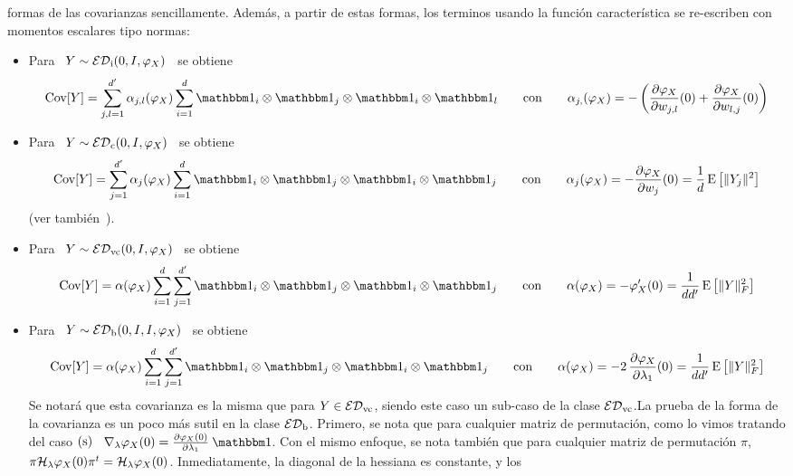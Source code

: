 \begin{itemize}
\begin{itemize}
    formas de las covarianzas sencillamente. Adem\'as, a partir de estas formas,
    los  terminos  usando  la  funci\'on  caracter\'istica  se  re-escriben  con
    momentos escalares tipo normas:
  \begin{itemize}
  \item Para \ $Y \sim \mathcal{ED}_{\mathrm{i}}(0,I,\varphi_X)$ \ se obtiene
  \[
  \Cov[Y] =  \sum_{j,l=1}^{d'} \alpha_{j,l}(\varphi_X) \sum_{i=1}^d  \un_i \otimes \un_j
  \otimes \un_i  \otimes \un_l \qquad \mbox{con} \qquad  \alpha_{j,}(\varphi_X) = -
   \left( \frac{\partial  \varphi_X}{\partial w_{j,l}}(0) + \frac{\partial
      \varphi_X}{\partial w_{l,j}}(0)
  \right) %
  \]
  \item Para \ $Y \sim \mathcal{ED}_{\mathrm{c}}(0,I,\varphi_X)$ \ se obtiene
  \[
  \Cov[Y] =  \sum_{j=1}^{d'} \alpha_j(\varphi_X) \sum_{i=1}^d  \un_i \otimes \un_j
  \otimes \un_i  \otimes \un_j \qquad \mbox{con} \qquad  \alpha_j(\varphi_X) = -
  \frac{\partial \varphi_X}{\partial  w_j}(0) = \frac{1}{d} \Esp\left[ \|
    Y_j \|^2 \right]
  \]
  (ver tambi\'en~\cite[Lem.~8]{FanChe84}).
  \item Para \ $Y \sim \mathcal{ED}_{\mathrm{vc}}(0,I,\varphi_X)$ \ se obtiene
  \[
  \Cov[Y] = \alpha(\varphi_X) \sum_{i=1}^d \sum_{j=1}^{d'} \un_i \otimes \un_j
  \otimes \un_i  \otimes \un_j \qquad \mbox{con} \qquad  \alpha(\varphi_X) = -
   \varphi_X'(0) = \frac{1}{d d'} \Esp\left[ \| Y \|_F^2 \right]
  \]
  \item Para \ $Y \sim \mathcal{ED}_{\mathrm{b}}(0,I,I,\varphi_X)$ \ se obtiene
  \[
  \Cov[Y] =  \alpha(\varphi_X) \sum_{i=1}^d \sum_{j=1}^{d'}  \un_i \otimes \un_j
  \otimes \un_i \otimes  \un_j \qquad \mbox{con} \qquad \alpha(\varphi_X)  = - 2
  \,   \frac{\partial  \varphi_X}{\partial   \lambda_1}(0)   =  \frac{1}{d   d'}
  \Esp\left[ \| Y \|_F^2 \right]
  \]
  Se notar\'a que esta covarianza es la misma que para $Y \in \mathcal{ED}_{\mathrm{vc}}$, siendo
  este caso un  sub-caso de la clase $\mathcal{ED}_{\mathrm{vc}}$.\newline La  prueba de la forma
  de la  covarianza es un poco m\'as  sutil en la clase  $\mathcal{ED}_{\mathrm{b}}$. Primero, se
  nota que  para cualquier matriz de  permutaci\'on, como lo  vimos tratando del
  caso   $(\mathrm{s})$   \   $\nabla_\lambda   \varphi_X   (0)   =   \frac{\partial
    \varphi_X(0)}{\partial \lambda_1}  \: \un$.  Con  el mismo enfoque,  se nota
  tambi\'en  que   para  cualquier  matriz   de  permutaci\'on  $\pi$,   \  $\pi
  \mathcal{H}_\lambda         \varphi_X(0)        \pi^t         =        \mathcal{H}_\lambda
  \varphi_X(0)$. Inmediatamente, la diagonal de  la hessiana es constante, y los

\end{itemize}
\end{itemize}
\end{itemize}
